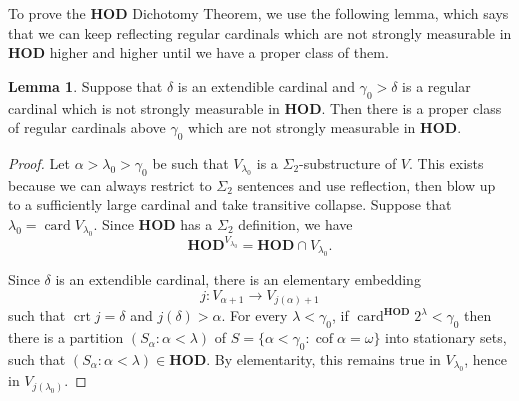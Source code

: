 \documentclass[12pt]{report}
\newcommand{\card}{\operatorname{card}}
\newcommand{\HOD}{\mathbf{HOD}}
\DeclareMathOperator{\cof}{cof}
\DeclareMathOperator{\crt}{crt}
\theoremstyle{definition}
\newtheorem{lemma}[theorem]{Lemma}
\begin{document}
To prove the $\HOD$ Dichotomy Theorem, we use the following lemma, which says that we can keep reflecting regular cardinals which are not strongly measurable in $\HOD$ higher and higher until we have a proper class of them.
\begin{lemma}
Suppose that $\delta$ is an extendible cardinal and $\gamma_0 > \delta$ is a regular cardinal which is not strongly measurable in $\HOD$.
Then there is a proper class of regular cardinals above $\gamma_0$ which are not strongly measurable in $\HOD$.
\end{lemma}
\begin{proof}
Let $\alpha > \lambda_0 > \gamma_0$ be such that $V_{\lambda_0}$ is a $\Sigma_2$-substructure of $V$.
This exists because we can always restrict to $\Sigma_2$ sentences and use reflection, then blow up to a sufficiently large cardinal and take transitive collapse.
Suppose that $\lambda_0 = \card V_{\lambda_0}$.
Since $\HOD$ has a $\Sigma_2$ definition, we have
$$\HOD^{V_{\lambda_0}} = \HOD \cap V_{\lambda_0}.$$

Since $\delta$ is an extendible cardinal, there is an elementary embedding
$$j: V_{\alpha + 1} \to V_{j(\alpha) + 1}$$
such that $\crt j =\delta$ and $j(\delta) > \alpha$.
For every $\lambda < \gamma_0$, if $\card^\HOD 2^\lambda < \gamma_0$ then there is a partition $(S_\alpha: \alpha < \lambda)$ of $S = \{\alpha < \gamma_0: \cof \alpha = \omega\}$ into stationary sets, such that $(S_\alpha: \alpha < \lambda) \in \HOD$.
By elementarity, this remains true in $V_{\lambda_0}$, hence in $V_{j(\lambda_0)}$.
\end{proof}
\end{document}
